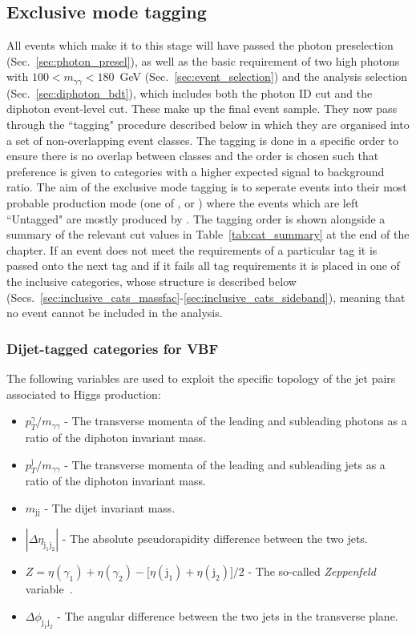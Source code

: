 \subsection{Exclusive mode tagging}
\label{sec:exclusive_tags}
All events which make it to this stage will have passed the photon preselection (Sec.~\ref{sec:photon_presel}), as well as the basic requirement of two high \pT photons with $100<m_{\gamma\gamma}<180$~GeV (Sec.~\ref{sec:event_selection}) and the \MFM analysis selection (Sec.~\ref{sec:diphoton_bdt}), which includes both the photon ID \MVA cut and the diphoton event-level \BDT cut. These make up the final event sample. They now pass through the ``tagging" procedure described below in which they are organised into a set of non-overlapping event classes. The tagging is done in a specific order to ensure there is no overlap between classes and the order is chosen such that preference is given to categories with a higher expected signal to background ratio. The aim of the exclusive mode tagging is to seperate events into their most probable production mode (one of \VBF, \VH or \ttH) where the events which are left ``Untagged" are mostly produced by \ggH. The tagging order is shown alongside a summary of the relevant cut values in Table~\ref{tab:cat_summary} at the end of the chapter. If an event does not meet the requirements of a particular tag it is passed onto the next tag and if it fails all tag requirements it is placed in one of the inclusive categories, whose structure is described below (Secs.~\ref{sec:inclusive_cats_massfac}-\ref{sec:inclusive_cats_sideband}), meaning that no event cannot be included in the analysis. 

\subsubsection{Dijet-tagged categories for VBF}
\label{sec:vbf_tag}

The following variables are used to exploit the specific topology of the jet pairs associated to \VBF Higgs production:

\begin{itemize}
  \item $p_{T}^{\gamma}/m_{\gamma\gamma}$ - The transverse momenta of the leading and subleading photons as a ratio of the diphoton invariant mass.
  \item $p_{T}^{\mathrm{j}}/m_{\gamma\gamma}$ - The transverse momenta of the leading and subleading jets as a ratio of the diphoton invariant mass.
  \item $m_{\mathrm{jj}}$ - The dijet invariant mass.
  \item $|\Delta\eta_{\mathrm{j}_{1}\mathrm{j}_{2}}|$ - The absolute pseudorapidity difference between the two jets.
  \item $Z = \eta(\gamma_{1})+\eta(\gamma_{2}) - \bigl[\eta(\mathrm{j}_{1})+\eta(\mathrm{j}_{2})\bigr]/2$ - The so-called \emph{Zeppenfeld} variable~\cite{Zeppenfeld}.
  \item $\Delta\phi_{\mathrm{j}_{1}\mathrm{j}_{2}}$ - The angular difference between the two jets in the transverse plane.
\end{itemize}

